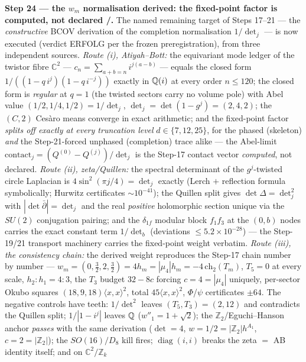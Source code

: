 \documentclass[11pt,a4paper]{article}
\newcommand{\Z}{\mathbb{Z}}
\theoremstyle{definition}
\begin{document}
\par\smallskip\noindent\textbf{Step 24 --- the $w_m$ normalisation derived: the fixed-point
factor is computed, not declared \mE/\mC.} The named remaining target of Steps 17--21 --- the
\emph{constructive} BCOV derivation of the completion normalisation $1/\det_j$ --- is now
executed (verdict ERFOLG per the frozen preregistration), from three independent sources.
\emph{Route (i), Atiyah--Bott:} the equivariant mode ledger of the twistor fibre $\mathbb C^2$
--- $c_n = \sum_{a+b=n} i^{j(a-b)}$ --- equals the closed form $1/((1-q\,i^j)(1-q\,i^{-j}))$
exactly in $\mathbb{Q}(i)$ at every order $n \le 120$; the closed form is \emph{regular} at $q = 1$
(the twisted sectors carry no volume pole) with Abel value $(1/2, 1/4, 1/2) = 1/\det_j$,
$\det_j = \det(1-g^j) = (2, 4, 2)$; the $(C,2)$ Ces\`aro means converge in exact arithmetic;
and the fixed-point factor \emph{splits off exactly at every truncation level} $d \in
\{7, 12, 25\}$, for the phased (skeleton) \emph{and} the Step-21-forced unphased (completion)
trace alike --- the Abel-limit $\mathrm{contact}_j = (Q^{(0)} - Q^{(j)})/\det_j$ is the Step-17
contact vector \emph{computed}, not declared. \emph{Route (ii), zeta/Quillen:} the spectral
determinant of the $g^j$-twisted circle Laplacian is $4\sin^2(\pi j/4) = \det_j$ exactly
(Lerch $+$ reflection formula symbolically; Hurwitz certificates $\sim 10^{-41}$); the Quillen
split gives $\det\Delta = \det_j^2$ with $|\det\bar\partial| = \det_j$ and the real
\emph{positive} holomorphic section unique via the $SU(2)$ conjugation pairing; and the
$\delta_{1f}$ modular block $f_1f_3$ at the $(0,b)$ nodes carries the exact constant term
$1/\det_b$ (deviations $\le 5.2\times10^{-28}$) --- the Step-19/21 transport machinery carries
the fixed-point weight verbatim. \emph{Route (iii), the consistency chain:} the derived weight
reproduces the Step-17 chain number by number --- $w_m = (0, \tfrac32, 2, \tfrac32) = 4h_m =
|\mu_4|h_m = -4\,\mathrm{ch}_2(T_m)$, $T_5 = 0$ at every scale, $h_2 : h_1 = 4 : 3$, the $T_3$
budget $32 - 8c$ forcing $c = 4 = |\mu_4|$ uniquely, per-sector Okubo squares
$(18, 9, 18)\langle x,x\rangle^2$, total $45\langle x,x\rangle^2$, $\Phi$/$\psi$ certificates
$\pm64$. The negative controls have teeth: $1/\det^2$ leaves $(T_5, T_3) = (2, 12)$ and
contradicts the Quillen split; $1/|1-i^j|$ leaves $\mathbb{Q}$ ($w''_1 = 1+\sqrt2$); the
$\Z_2$/Eguchi--Hanson anchor \emph{passes} with the same derivation ($\det = 4$,
$w = 1/2 = |\Z_2|h^{A_1}$, $c = 2 = |\Z_2|$); the $SO(16)/D_8$ kill fires;
$\operatorname{diag}(i,i)$ breaks the zeta $=$ AB identity itself; and on $\mathbb C^2/\Z_k$
\end{document}
